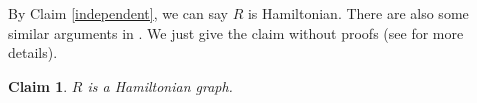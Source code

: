 \documentclass[11pt]{article}
\newtheorem{claim}[lemma]{Claim}
\begin{document}
%
%
%
%
%
%
%
%
%
%
%

By Claim \ref{independent}, we can say $R$ is Hamiltonian. There are also some similar arguments in \cite{chen}. We just give the claim without proofs (see \cite{chen} for more details).

\begin{claim}
$R$ is a Hamiltonian graph.
\end{claim}
\end{document}
